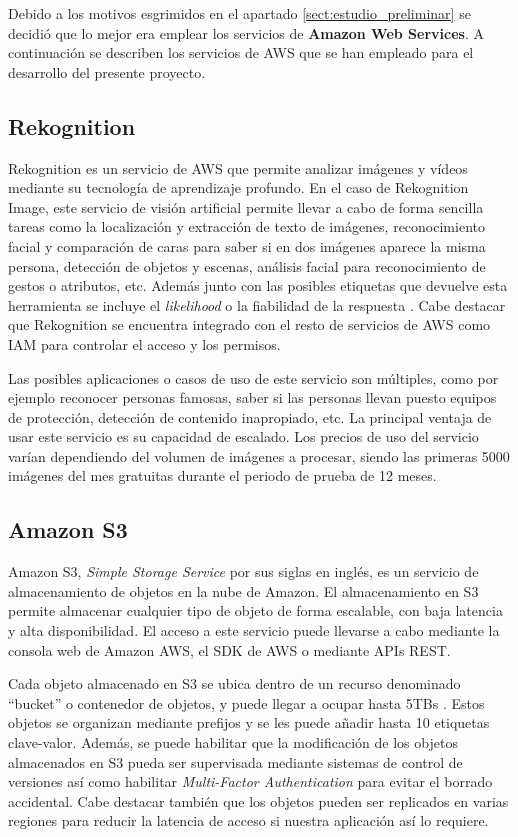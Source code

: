 Debido a los motivos esgrimidos en el apartado \ref{sect:estudio_preliminar} se decidió que lo mejor era emplear los servicios de \textbf{Amazon Web Services}. A continuación se describen los servicios de AWS que se han empleado para el desarrollo del presente proyecto.

\subsection{Rekognition}
\label{sect:rekognition}

Rekognition es un servicio de AWS que permite analizar imágenes y vídeos mediante su tecnología de aprendizaje profundo. En el caso de Rekognition Image, este servicio de visión artificial permite llevar a cabo de forma sencilla tareas como la localización y extracción de texto de imágenes, reconocimiento facial y comparación de caras para saber si en dos imágenes aparece la misma persona, detección de objetos y escenas, análisis facial para reconocimiento de gestos o atributos, etc. Además junto con las posibles etiquetas que devuelve esta herramienta se incluye el \textit{likelihood} o la fiabilidad de la respuesta \cite{amazon_rekognition}. Cabe destacar que Rekognition se encuentra integrado con el resto de servicios de AWS como IAM para controlar el acceso y los permisos.

Las posibles aplicaciones o casos de uso de este servicio son múltiples, como por ejemplo reconocer personas famosas, saber si las personas llevan puesto equipos de protección, detección de contenido inapropiado, etc. La principal ventaja de usar este servicio es su capacidad de escalado. Los precios de uso del servicio varían dependiendo del volumen de imágenes a procesar, siendo las primeras 5000 imágenes del mes gratuitas durante el periodo de prueba de 12 meses.

\subsection{Amazon S3}
Amazon S3, \textit{Simple Storage Service} por sus siglas en inglés, es un servicio de almacenamiento de objetos en la nube de Amazon. El almacenamiento en S3 permite almacenar cualquier tipo de objeto de forma escalable, con baja latencia y alta disponibilidad. El acceso a este servicio puede llevarse a cabo mediante la consola web de Amazon AWS, el SDK de AWS o mediante APIs REST.

Cada objeto almacenado en S3 se ubica dentro de un recurso denominado ``bucket'' o contenedor de objetos, y puede llegar a ocupar hasta 5TBs \cite{amazon_s3}. Estos objetos se organizan mediante prefijos y se les puede añadir hasta 10 etiquetas clave-valor. Además, se puede habilitar que la modificación de los objetos almacenados en S3 pueda ser supervisada mediante sistemas de control de versiones así como habilitar \textit{Multi-Factor Authentication} para evitar el borrado accidental. Cabe destacar también que los objetos pueden ser replicados en varias regiones para reducir la latencia de acceso si nuestra aplicación así lo requiere.

